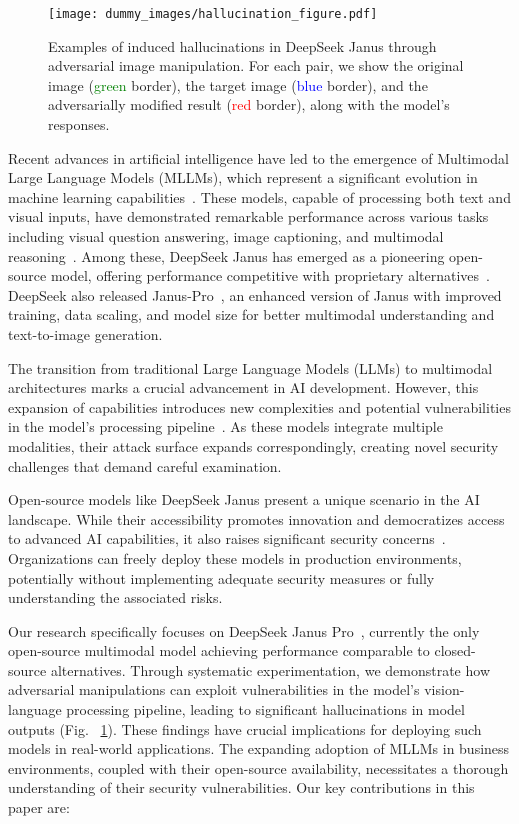 \documentclass[runningheads]{llncs}
\begin{document}
\begin{figure}[ht!]
\centering
\texttt{[image: dummy\_images/hallucination\_figure.pdf]}
\caption{Examples of induced hallucinations in DeepSeek Janus through adversarial image manipulation. For each pair, we show the original image (\textcolor{green}{green} border), the target image (\textcolor{blue}{blue} border), and the adversarially modified result (\textcolor{red}{red} border), along with the model's responses.}
\label{fig:hallucination_examples}
\end{figure}
Recent advances in artificial intelligence have led to the emergence of Multimodal Large Language Models (MLLMs), which represent a significant evolution in machine learning capabilities~\cite{alayrac2022flamingo, driess2023palm, liu2024visual}. These models, capable of processing both text and visual inputs, have demonstrated remarkable performance across various tasks including visual question answering, image captioning, and multimodal reasoning~\cite{achiam2023gpt}. Among these, DeepSeek Janus has emerged as a pioneering open-source model, offering performance competitive with proprietary alternatives~\cite{wu2024janus}. DeepSeek also released Janus-Pro~\cite{chen2025janus}, an enhanced version of Janus with improved training, data scaling, and model size for better multimodal understanding and text-to-image generation.

The transition from traditional Large Language Models (LLMs) to multimodal architectures marks a crucial advancement in AI development. However, this expansion of capabilities introduces new complexities and potential vulnerabilities in the model's processing pipeline~\cite{liu2024visual, cui2024robustness}. As these models integrate multiple modalities, their attack surface expands correspondingly, creating novel security challenges that demand careful examination.

Open-source models like DeepSeek Janus present a unique scenario in the AI landscape. While their accessibility promotes innovation and democratizes access to advanced AI capabilities, it also raises significant security concerns~\cite{qiu2019review,chakraborty2021survey}. Organizations can freely deploy these models in production environments, potentially without implementing adequate security measures or fully understanding the associated risks.

Our research specifically focuses on DeepSeek Janus Pro~\cite{chen2025janus}, currently the only open-source multimodal model achieving performance comparable to closed-source alternatives. Through systematic experimentation, we demonstrate how adversarial manipulations can exploit vulnerabilities in the model's vision-language processing pipeline, leading to significant hallucinations in model outputs (Fig. ~\ref{fig:hallucination_examples}). These findings have crucial implications for deploying such models in real-world applications. The expanding adoption of MLLMs in business environments, coupled with their open-source availability, necessitates a thorough understanding of their security vulnerabilities. Our key contributions in this paper are:
\end{document}
